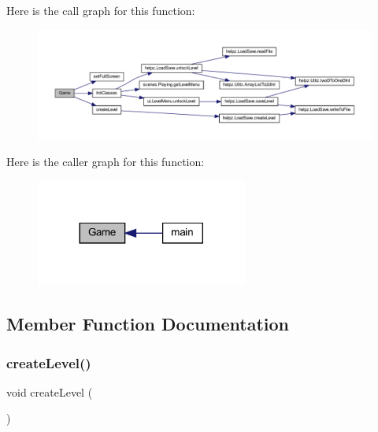 Here is the call graph for this function\+:
\nopagebreak
\begin{figure}[H]
\begin{center}
\leavevmode
\includegraphics[width=350pt]{classprogetto_1_1_game_a98d87ba6bde3f389e92664a2ef9bfcb1_cgraph}
\end{center}
\end{figure}
Here is the caller graph for this function\+:\nopagebreak
\begin{figure}[H]
\begin{center}
\leavevmode
\includegraphics[width=197pt]{classprogetto_1_1_game_a98d87ba6bde3f389e92664a2ef9bfcb1_icgraph}
\end{center}
\end{figure}


\subsection{Member Function Documentation}
\mbox{\label{classprogetto_1_1_game_ad79f312dd3a9e52f38a9e5f1536537fd}} 
\subsubsection{\texorpdfstring{create\+Level()}{createLevel()}}
{\footnotesize\ttfamily void create\+Level (\begin{DoxyParamCaption}{ }\end{DoxyParamCaption})}



